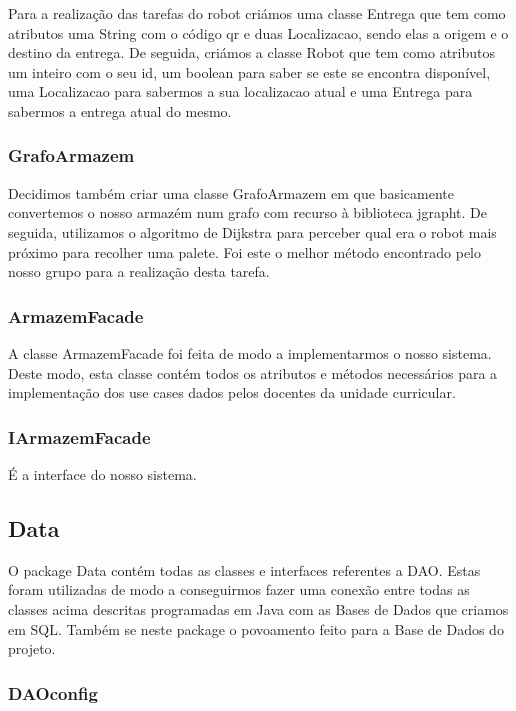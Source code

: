 \documentclass[11pt]{article}
\begin{document}
Para a realização das tarefas do robot criámos uma classe Entrega que tem como atributos uma String com o código qr e duas Localizacao, sendo elas a origem e o destino da entrega. De seguida, criámos a classe Robot que tem como atributos um inteiro com o seu id, um boolean para saber se este se encontra disponível, uma Localizacao para sabermos a sua localizacao atual e uma Entrega para sabermos a entrega atual do mesmo.

\subsubsection{GrafoArmazem}

Decidimos também criar uma classe GrafoArmazem em que basicamente convertemos o nosso armazém num grafo com recurso à biblioteca jgrapht. De seguida, utilizamos o algoritmo de Dijkstra para perceber qual era o robot mais próximo para recolher uma palete. Foi este o melhor método encontrado pelo nosso grupo para a realização desta tarefa.

\subsubsection{ArmazemFacade}

A classe ArmazemFacade foi feita de modo a implementarmos o nosso sistema. Deste modo, esta classe contém todos os atributos e métodos necessários para a implementação dos use cases dados pelos docentes da unidade curricular.

\subsubsection{IArmazemFacade}

É a interface do nosso sistema.

\subsection{Data}

O package Data contém todas as classes e interfaces referentes a DAO. Estas foram utilizadas de modo a conseguirmos fazer uma conexão entre todas as classes acima descritas programadas em Java com as Bases de Dados que criamos em SQL. Também se neste package o povoamento feito para a Base de Dados do projeto.

\subsubsection{DAOconfig}
\end{document}
